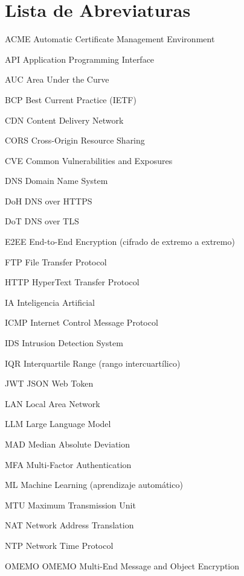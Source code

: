 \chapter*{Lista de Abreviaturas}
\begin{abbrv}

\item[ACME] Automatic Certificate Management Environment
\item[API] Application Programming Interface
\item[AUC] Area Under the Curve
\item[BCP] Best Current Practice (IETF)
\item[CDN] Content Delivery Network
\item[CORS] Cross-Origin Resource Sharing
\item[CVE] Common Vulnerabilities and Exposures
\item[DNS] Domain Name System
\item[DoH] DNS over HTTPS
\item[DoT] DNS over TLS
\item[E2EE] End-to-End Encryption (cifrado de extremo a extremo)
\item[FTP] File Transfer Protocol
\item[HTTP] HyperText Transfer Protocol
\item[IA] Inteligencia Artificial
\item[ICMP] Internet Control Message Protocol
\item[IDS] Intrusion Detection System
\item[IQR] Interquartile Range (rango intercuartílico)
\item[JWT] JSON Web Token
\item[LAN] Local Area Network
\item[LLM] Large Language Model
\item[MAD] Median Absolute Deviation
\item[MFA] Multi-Factor Authentication
\item[ML] Machine Learning (aprendizaje automático)
\item[MTU] Maximum Transmission Unit
\item[NAT] Network Address Translation
\item[NTP] Network Time Protocol
\item[OMEMO] OMEMO Multi-End Message and Object Encryption

\end{abbrv}
